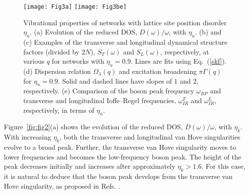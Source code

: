 \documentclass[twocolumn,printnumbers,amsmath,amssymb,prl,verbatim]{revtex4}
\begin{document}
\begin{figure}
	\texttt{[image: Fig3a]}
	\texttt{[image: Fig3be]}
\caption{\label{fig:fig3} Vibrational properties of networks with lattice site position disorder $\eta_u$. (a) Evolution of the reduced DOS, $D(\omega)/\omega$, with $\eta_u$. (b) and (c) Examples of the transverse and longitudinal dynamical structure factors (divided by $2N$), $S_{T}(\omega)$ and $S_{L}(\omega)$, respectively, at various $q$ for networks with $\eta_u=0.9$. Lines are fits using Eq.~(\ref{skf}). (d) Dispersion relation $\Omega_{\lambda}(q)$ and excitation broadening $\pi\Gamma(q)$ for $\eta_u=0.9$. Solid and dashed lines have slopes of $1$ and $2$, respectively. (e) Comparison of the boson peak frequency $\omega_{BP}$ and transverse and longitudinal Ioffe--Regel frequencies, $\omega_{IR}^T$ and $\omega_{IR}^L$, respectively, in terms of $\eta_u$.
}
\end{figure}

Figure~\ref{fig:fig2}(a) shows the evolution of the reduced DOS, $D(\omega)/\omega$, with $\eta_k$. With increasing $\eta_k$, both the transverse and longitudinal van Hove singularities evolve to a broad peak. Further, the transverse van Hove singularity moves to lower frequencies and becomes the low-frequency boson peak. The height of the peak decreases initially and increases after approximately $\eta_k>1.6$. For this case, it is natural to deduce that the boson peak develops from the transverse van Hove singularity, as proposed in Refs. \cite{chumakov2,schirmacher1,taraskin}.
\end{document}
